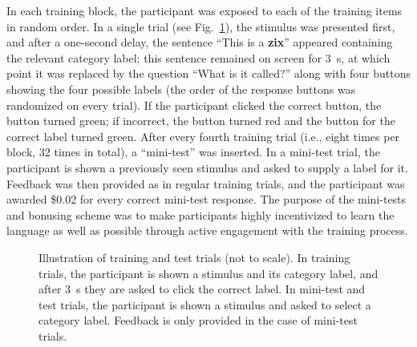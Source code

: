 \documentclass[doc,biblatex]{apa7}
\begin{document}
In each training block, the participant was exposed to each of the training items in random order. In a single trial (see Fig.~\ref{fig09}), the stimulus was presented first, and after a one-second delay, the sentence ``This is a \textbf{zix}'' appeared containing the relevant category label; this sentence remained on screen for 3~s, at which point it was replaced by the question ``What is it called?'' along with four buttons showing the four possible labels (the order of the response buttons was randomized on every trial). If the participant clicked the correct button, the button turned green; if incorrect, the button turned red and the button for the correct label turned green. After every fourth training trial (i.e., eight times per block, 32 times in total), a ``mini-test'' was inserted. In a mini-test trial, the participant is shown a previously seen stimulus and asked to supply a label for it. Feedback was then provided as in regular training trials, and the participant was awarded \$0.02 for every correct mini-test response. The purpose of the mini-tests and bonusing scheme was to make participants highly incentivized to learn the language as well as possible through active engagement with the training process.

	\begin{figure}
	\vspace*{2pt}
	\caption{Illustration of training and test trials (not to scale). In training trials, the participant is shown a stimulus and its category label, and after 3~s they are asked to click the correct label. In mini-test and test trials, the participant is shown a stimulus and asked to select a category label. Feedback is only provided in the case of mini-test trials.}
	\label{fig09}
	\end{figure}
\end{document}
